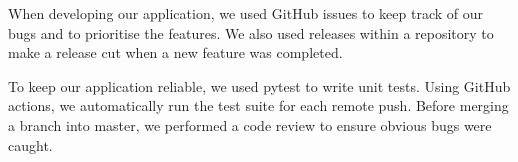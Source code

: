 When developing our application, we used GitHub issues to keep track of our bugs and to prioritise the features. We also used releases within a repository to make a release cut when a new feature was completed.

To keep our application reliable, we used pytest to write unit tests. Using GitHub actions, we automatically run the test suite for each remote push. Before merging a branch into master, we performed a code review to ensure obvious bugs were caught.